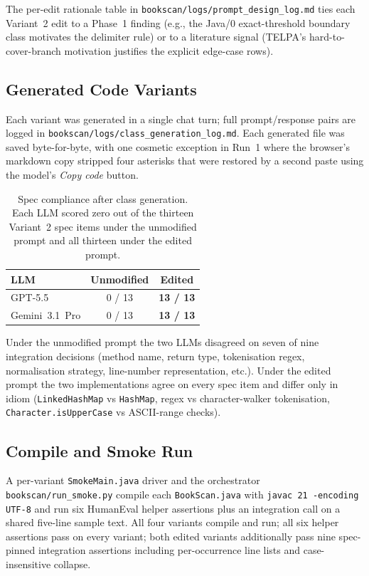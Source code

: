 \documentclass[journal]{IEEEtran}
\begin{document}
The per-edit rationale table in
\texttt{bookscan/logs/prompt\_design\_log.md} ties each Variant~2
edit to a Phase~1 finding (e.g., the Java/0 exact-threshold
boundary class motivates the delimiter rule) or to a literature
signal (TELPA's hard-to-cover-branch motivation justifies the
explicit edge-case rows).

\subsection{Generated Code Variants}
\label{sec:p2variants}

Each variant was generated in a single chat turn; full
prompt/response pairs are logged in
\texttt{bookscan/logs/class\_generation\_log.md}. Each generated
file was saved byte-for-byte, with one cosmetic exception in
Run~1 where the browser's markdown copy stripped four asterisks
that were restored by a second paste using the model's
\emph{Copy code} button.

\begin{table}[!t]
\centering
\caption{Spec compliance after class generation. Each LLM scored
zero out of the thirteen Variant~2 spec items under the
unmodified prompt and all thirteen under the edited prompt.}
\label{tab:p2specitems}
\renewcommand{\arraystretch}{1.15}
\begin{tabular}{@{}l c c@{}}
\toprule
\textbf{LLM} & \textbf{Unmodified} & \textbf{Edited} \\
\midrule
GPT-5.5        & 0 / 13 & \textbf{13 / 13} \\
Gemini~3.1~Pro & 0 / 13 & \textbf{13 / 13} \\
\bottomrule
\end{tabular}
\end{table}

Under the unmodified prompt the two LLMs disagreed on seven of
nine integration decisions (method name, return type,
tokenisation regex, normalisation strategy, line-number
representation, etc.). Under the edited prompt the two
implementations agree on every spec item and differ only in
idiom (\texttt{LinkedHashMap} vs \texttt{HashMap}, regex vs
character-walker tokenisation, \texttt{Character.isUpperCase}
vs ASCII-range checks).

\subsection{Compile and Smoke Run}
\label{sec:p2smoke}

A per-variant \texttt{SmokeMain.java} driver and the
orchestrator \texttt{bookscan/run\_smoke.py} compile each
\texttt{BookScan.java} with \texttt{javac~21 -encoding UTF-8}
and run six HumanEval helper assertions plus an integration
call on a shared five-line sample text. All four variants
compile and run; all six helper assertions pass on every
variant; both edited variants additionally pass nine
spec-pinned integration assertions including per-occurrence
line lists and case-insensitive collapse.
\end{document}
